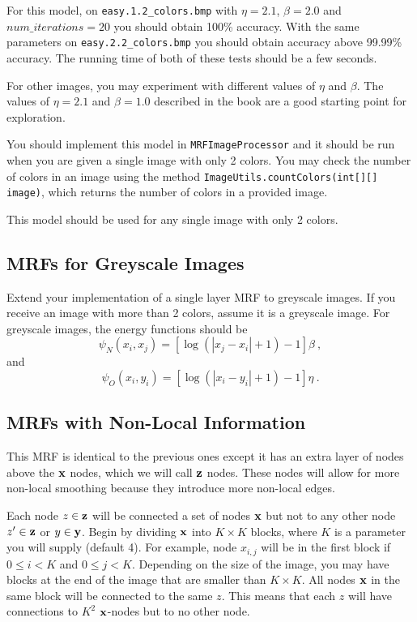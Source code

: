 \documentclass[11pt]{article}
\newcommand{\vx}{{\bf x}}
\newcommand{\vy}{{\bf y}}
\newcommand{\vz}{{\bf z}}
\newcommand{\code}[1]{{\footnotesize \tt #1}}
\begin{document}
For this model, on \code{easy.1.2\_colors.bmp} with $\eta=2.1$, $\beta=2.0$ and $num\_iterations=20$ you should obtain 100\% accuracy. With the same parameters on \code{easy.2.2\_colors.bmp} you should obtain accuracy above 99.99\% accuracy. The running time of both of these tests should be a few seconds.

For other images, you may experiment with different values of $\eta$ and $\beta$. The values of $\eta=2.1$ and $\beta=1.0$ described in the book are a good starting point for exploration.

You should implement this model in \code{MRFImageProcessor} and it should be run when you are given a single image with only 2 colors. You may check the number of colors in an image using the method \code{ImageUtils.countColors(int[][] image)}, which returns the number of colors in a provided image.

This model should be used for any single image with only 2 colors.

\subsection{MRFs for Greyscale Images}
Extend your implementation of a single layer MRF to greyscale images. If you receive an image with more than 2 colors, assume it is a greyscale image. For greyscale images, the energy functions should be
\[
\psi_N(x_i, x_j) = [\log (|x_j -x_i| +1) -1] \beta ~,
\]
and
\[
\psi_O(x_i, y_i) = [\log (|x_i - y_i| +1) -1] \eta ~.
\]

\subsection{MRFs with Non-Local Information}
This MRF is identical to the previous ones except it has an extra layer of nodes above the $\vx$ nodes, which we will call $\vz$ nodes. These nodes will allow for more non-local smoothing because they introduce more non-local edges.

Each node $z \in \vz$ will be connected a set of nodes $\vx$ but not to any other node $z' \in \vz$ or $y \in \vy$. Begin by dividing $\vx$ into $K \times K$ blocks, where $K$ is a parameter you will supply (default 4). For example, node $x_{i,j}$ will be in the first block if $0 \le i < K$ and $0 \le j < K$. Depending on the size of the image, you may have blocks at the end of the image that are smaller than $K \times K$. All nodes $\vx$ in the same block will be connected to the same $z$. This means that each $z$ will have connections to $K^2$ $\vx$-nodes but to no other node.
\end{document}

